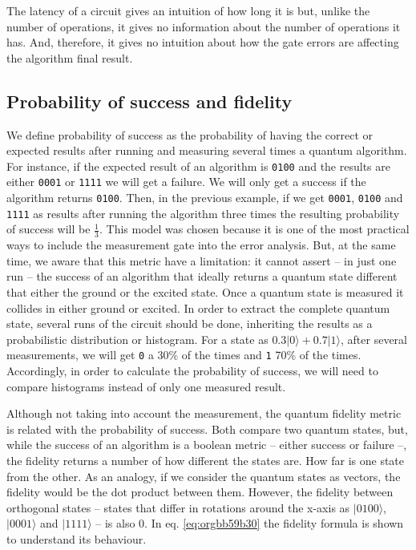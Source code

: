 The latency of a circuit gives an intuition of how long it is but, unlike the number of operations, it gives no information about the number of operations it has.
And, therefore, it gives no intuition about how the gate errors are affecting the algorithm final result.

\subsection*{Probability of success and fidelity}
\label{sec:org3eeba76}

We define probability of success as the probability of having the correct or expected results after running and measuring several times a quantum algorithm.
For instance, if the expected result of an algorithm is \texttt{0100} and the results are either \texttt{0001} or \texttt{1111} we will get a failure.
We will only get a success if the algorithm returns \texttt{0100}.
Then, in the previous example, if we get \texttt{0001}, \texttt{0100} and \texttt{1111} as results after running the algorithm three times the resulting probability of success will be \(\frac{1}{3}\).
This model was chosen because it is one of the most practical ways to include the measurement gate into the error analysis.
But, at the same time, we aware that this metric have a limitation: it cannot assert -- in just one run -- the success of an algorithm that ideally returns a quantum state different that either the ground or the excited state.
Once a quantum state is measured it collides in either ground or excited.
In order to extract the complete quantum state, several runs of the circuit should be done, inheriting the results as a probabilistic distribution or histogram.
For a state as \(0.3 | 0 \rangle + 0.7 | 1 \rangle\), after several measurements, we will get \texttt{0} a 30\% of the times and \texttt{1} 70\% of the times.
Accordingly, in order to calculate the probability of success, we will need to compare histograms instead of only one measured result.

Although not taking into account the measurement, the quantum fidelity metric is related with the probability of success.
Both compare two quantum states, but, while the success of an algorithm is a boolean metric -- either success or failure --, the fidelity returns a number of how different the states are.
How far is one state from the other.
As an analogy, if we consider the quantum states as vectors, the fidelity would be the dot product between them.
However, the fidelity between orthogonal states -- states that differ in rotations around the x-axis as \(| 0100 \rangle\), \(| 0001 \rangle\) and \(| 1111 \rangle\) -- is also 0.
In eq. \ref{eq:orgbb59b30} the fidelity formula is shown to understand its behaviour.

